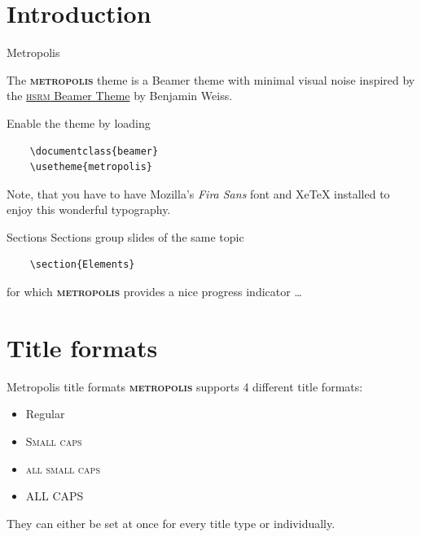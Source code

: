 \documentclass[10pt]{beamer}
\newcommand{\themename}{\textbf{\textsc{metropolis}}\xspace}
\begin{document}











\section{Introduction}

\begin{frame}[fragile]{Metropolis}

  The \themename theme is a Beamer theme with minimal visual noise
  inspired by the \href{https://github.com/hsrmbeamertheme/hsrmbeamertheme}{\textsc{hsrm} Beamer
  Theme} by Benjamin Weiss.

  Enable the theme by loading

  \begin{verbatim}    \documentclass{beamer}
    \usetheme{metropolis}\end{verbatim}

  Note, that you have to have Mozilla's \emph{Fira Sans} font and XeTeX
  installed to enjoy this wonderful typography.
\end{frame}
\begin{frame}[fragile]{Sections}
  Sections group slides of the same topic

  \begin{verbatim}    \section{Elements}\end{verbatim}

  for which \themename provides a nice progress indicator \ldots
\end{frame}

\section{Title formats}

\begin{frame}{Metropolis title formats}
	\themename supports 4 different title formats:
	\begin{itemize}
		\item Regular
		\item \textsc{Small caps}
		\item \textsc{all small caps}
		\item ALL CAPS
	\end{itemize}
	They can either be set at once for every title type or individually.
\end{frame}
\end{document}
